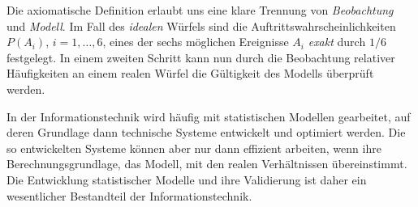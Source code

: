 Die axiomatische Definition erlaubt uns eine klare Trennung von \textit{Beobachtung} und \textit{Modell}. Im Fall des \textit{idealen} Würfels sind die Auftrittswahrscheinlichkeiten $P(A_i)$, $i = 1, \ldots, 6$, eines der sechs möglichen Ereignisse $A_i$ \textit{exakt} durch $1/6$ festgelegt. In einem zweiten Schritt kann nun durch die Beobachtung relativer Häufigkeiten an einem realen Würfel die Gültigkeit des Modells überprüft werden.

In der Informationstechnik wird häufig mit statistischen Modellen gearbeitet, auf deren Grundlage dann technische Systeme entwickelt und optimiert werden. Die so entwickelten Systeme können aber nur dann effizient arbeiten, wenn ihre Berechnungsgrundlage, das Modell, mit den realen Verhältnissen übereinstimmt. Die Entwicklung statistischer Modelle und ihre Validierung ist daher ein wesentlicher Bestandteil der Informationstechnik.
